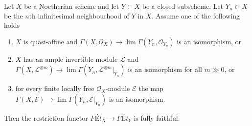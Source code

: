 \begin{lemma}
\label{lemma-restriction-fully-faithful}
Let $X$ be a Noetherian scheme and let $Y \subset X$ be a closed subscheme.
Let $Y_n \subset X$ be the $n$th infinitesimal neighbourhood of $Y$ in $X$.
Assume one of the following holds
\begin{enumerate}
\item $X$ is quasi-affine and
$\Gamma(X, \mathcal{O}_X) \to \lim \Gamma(Y_n, \mathcal{O}_{Y_n})$
is an isomorphism, or
\item $X$ has an ample invertible module $\mathcal{L}$ and
$\Gamma(X, \mathcal{L}^{\otimes m}) \to
\lim \Gamma(Y_n, \mathcal{L}^{\otimes m}|_{Y_n})$
is an isomorphism for all $m \gg 0$, or
\item for every finite locally free $\mathcal{O}_X$-module
$\mathcal{E}$ the map
$\Gamma(X, \mathcal{E}) \to \lim \Gamma(Y_n, \mathcal{E}|_{Y_n})$
is an isomorphism.
\end{enumerate}
Then the restriction functor $\textit{F\'Et}_X \to \textit{F\'Et}_Y$
is fully faithful.
\end{lemma}

